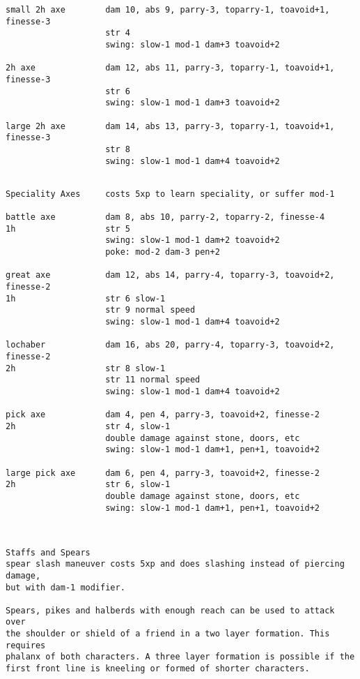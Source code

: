 \begin{verbatim}
small 2h axe        dam 10, abs 9, parry-3, toparry-1, toavoid+1, finesse-3
                    str 4
                    swing: slow-1 mod-1 dam+3 toavoid+2

2h axe              dam 12, abs 11, parry-3, toparry-1, toavoid+1, finesse-3
                    str 6
                    swing: slow-1 mod-1 dam+3 toavoid+2

large 2h axe        dam 14, abs 13, parry-3, toparry-1, toavoid+1, finesse-3
                    str 8
                    swing: slow-1 mod-1 dam+4 toavoid+2


\end{verbatim} \goodbreak \begin{verbatim}
Speciality Axes     costs 5xp to learn speciality, or suffer mod-1

battle axe          dam 8, abs 10, parry-2, toparry-2, finesse-4
1h                  str 5
                    swing: slow-1 mod-1 dam+2 toavoid+2
                    poke: mod-2 dam-3 pen+2

great axe           dam 12, abs 14, parry-4, toparry-3, toavoid+2, finesse-2
1h                  str 6 slow-1
                    str 9 normal speed
                    swing: slow-1 mod-1 dam+4 toavoid+2

lochaber            dam 16, abs 20, parry-4, toparry-3, toavoid+2, finesse-2
2h                  str 8 slow-1
                    str 11 normal speed
                    swing: slow-1 mod-1 dam+4 toavoid+2

pick axe            dam 4, pen 4, parry-3, toavoid+2, finesse-2
2h                  str 4, slow-1
                    double damage against stone, doors, etc
                    swing: slow-1 mod-1 dam+1, pen+1, toavoid+2

large pick axe      dam 6, pen 4, parry-3, toavoid+2, finesse-2
2h                  str 6, slow-1
                    double damage against stone, doors, etc
                    swing: slow-1 mod-1 dam+1, pen+1, toavoid+2



\end{verbatim} \goodbreak \begin{verbatim}
Staffs and Spears
spear slash maneuver costs 5xp and does slashing instead of piercing damage, 
but with dam-1 modifier.

Spears, pikes and halberds with enough reach can be used to attack over 
the shoulder or shield of a friend in a two layer formation. This requires 
phalanx of both characters. A three layer formation is possible if the 
first front line is kneeling or formed of shorter characters.


\end{verbatim}
